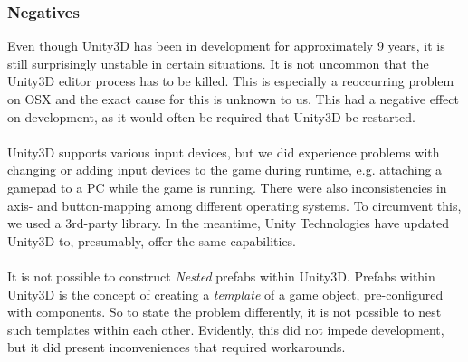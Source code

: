 \subsubsection*{Negatives}

Even though Unity3D has been in development for approximately 9 years, it is
still surprisingly unstable in certain situations. It is not uncommon that the
Unity3D editor process has to be killed. This is especially a
reoccurring problem on OSX and the exact cause for this is unknown to us. This
had a negative effect on development, as it would often be required that Unity3D
be restarted.
\\
\\
Unity3D supports various input devices, but we did experience problems with
changing or adding input devices to the game during runtime, e.g. attaching a
gamepad to a PC while the game is running. There were also inconsistencies in
axis- and button-mapping among different operating systems. To circumvent this,
we used a 3rd-party library. In the meantime, Unity Technologies have updated
Unity3D to, presumably, offer the same capabilities.
\\
\\
It is not possible to construct \textit{Nested} prefabs within Unity3D. Prefabs
within Unity3D is the concept of creating a \textit{template} of a game object,
pre-configured with components. So to state the problem differently, it is not
possible to nest such templates within each other. Evidently, this did not
impede development, but it did present inconveniences that required
workarounds.




%

